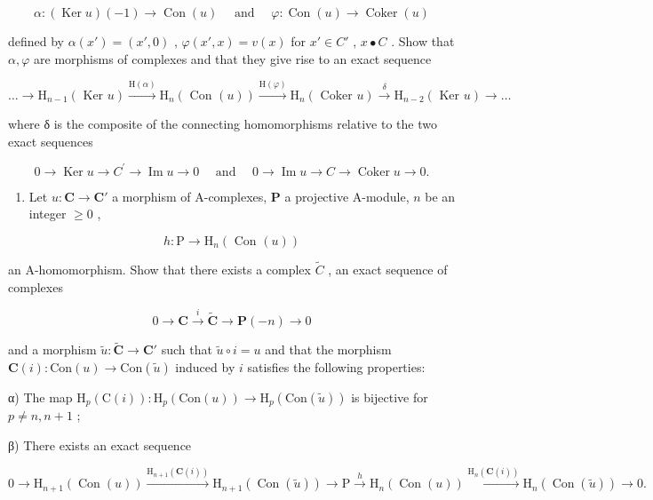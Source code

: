 \[
\alpha : (\operatorname{Ker} u) (- 1) \rightarrow \operatorname{Con} (u) \quad \text { and } \quad \varphi : \operatorname{Con} (u) \rightarrow \operatorname{Coker} (u)
\]

defined by \(\alpha(x') = (x', 0)\) , \(\varphi(x', x) = v(x)\) for \(x' \in C'\) , \(x \bullet C\) . Show that \(\alpha, \varphi\) are morphisms of complexes and that they give rise to an exact sequence

\[
\dots \rightarrow \mathrm{H} _ {n - 1} (\text { Ker } u) \xrightarrow {\mathrm{H} (\alpha)} \mathrm{H} _ {n} (\text { Con } (u)) \xrightarrow {\mathrm{H} (\varphi)} \mathrm{H} _ {n} (\text { Coker } u) \xrightarrow {\delta} \mathrm{H} _ {n - 2} (\text { Ker } u) \rightarrow \dots
\]

where δ is the composite of the connecting homomorphisms relative to the two exact sequences

\[
0 \rightarrow \operatorname{Ker} u \rightarrow C ^ {\prime} \rightarrow \operatorname{Im} u \rightarrow 0 \quad \text { and } \quad 0 \rightarrow \operatorname{Im} u \rightarrow C \rightarrow \operatorname{Coker} u \rightarrow 0.
\]

\begin{enumerate}
\def\labelenumi{\arabic{enumi})}
\setcounter{enumi}{9}
\tightlist
\item
  Let \(u: \mathbf{C} \to \mathbf{C}'\) a morphism of A-complexes, \(\mathbf{P}\) a projective A-module, \(n\) be an integer \(\geqslant 0\) ,
\end{enumerate}

\[
h: \mathrm{P} \rightarrow \mathrm{H} _ {n} (\text { Con } (u))
\]

an A-homomorphism. Show that there exists a complex \(\tilde{C}\) , an exact sequence of complexes

\[
0 \to \mathbf {C} \xrightarrow {i} \tilde {\mathbf {C}} \to \mathbf {P} (- n) \to 0
\]

and a morphism \(\tilde{u}:\tilde{\mathbf{C}}\to \mathbf{C}'\) such that \(\tilde{u}\circ i = u\) and that the morphism \(\mathbf{C}(i):\mathrm{Con}(u)\to \mathrm{Con}(\tilde{u})\) induced by \(i\) satisfies the following properties:

α) The map \(\mathrm{H}_{p}(\mathrm{C}(i)) : \mathrm{H}_{p}(\mathrm{Con}(u)) \to \mathrm{H}_{p}(\mathrm{Con}(\tilde{u}))\) is bijective for \(p \neq n, n + 1\) ;

β) There exists an exact sequence

\[
0 \rightarrow \mathrm{H} _ {n + 1} (\operatorname{Con} (u)) \xrightarrow {\mathrm{H} _ {n + 1} (\mathbf {C} (i))} \mathrm{H} _ {n + 1} (\operatorname{Con} (\tilde {u})) \rightarrow \mathrm{P} \xrightarrow {h} \mathrm{H} _ {n} (\operatorname{Con} (u)) \xrightarrow {\mathrm{H} _ {n} (\mathbf {C} (i))} \mathrm{H} _ {n} (\operatorname{Con} (\tilde {u})) \rightarrow 0.
\]

